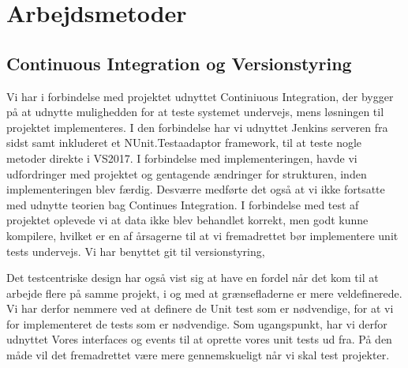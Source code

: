 
\section{Arbejdsmetoder}

\subsection{Continuous Integration og Versionstyring}

Vi har i forbindelse med projektet udnyttet Continiuous Integration, 
der bygger på at udnytte mulighedden for at teste systemet undervejs, 
mens løsningen til projektet implementeres. 
I den forbindelse har vi udnyttet Jenkins serveren fra sidst samt inkluderet 
et NUnit.Testaadaptor framework, til at teste nogle metoder direkte i VS2017. 
I forbindelse med implementeringen, havde vi udfordringer med projektet 
og gentagende ændringer for strukturen, inden implementeringen blev færdig. 
Desværre medførte det også at vi ikke fortsatte med udnytte teorien bag Continues 
Integration. I forbindelse med test af projektet oplevede vi at data ikke blev 
behandlet korrekt, men godt kunne kompilere, hvilket er en af årsagerne til 
at vi fremadrettet bør implementere unit tests undervejs.
Vi har benyttet git til versionstyring, 

Det testcentriske design har også vist sig at have en fordel når det kom til at arbejde 
flere på samme projekt, i og med at grænsefladerne er mere veldefinerede. 
Vi har derfor nemmere ved at definere de Unit test som er nødvendige, 
for at vi for implementeret de tests som er nødvendige.
Som ugangspunkt, har vi derfor udnyttet Vores interfaces og events til 
at oprette vores unit tests ud fra. På den måde vil det fremadrettet være mere 
gennemskueligt når vi skal test projekter.